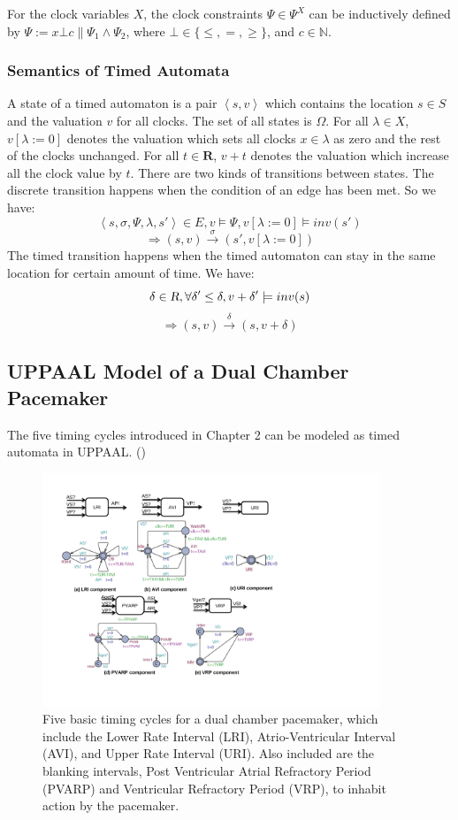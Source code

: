 For the clock variables $X$, the clock constraints $\Psi\in\Psi^X$ can be inductively defined by $\Psi:=x\bot c\|\Psi_1\wedge\Psi_2$, where $\bot\in\{\leq,=,\geq\}$, and $c\in\mathbb{N}$.
\subsubsection{Semantics of Timed Automata}
A state of a timed automaton is a pair $\left\langle s,v\right\rangle$ which contains the location $s\in S$ and the valuation $v$ for all clocks. The set of all states is $\Omega$. For all $\lambda\in X$, $v[\lambda :=0]$ denotes the valuation which sets all clocks $x\in\lambda$ as zero and the rest of the clocks unchanged. For all $t\in \textbf{R}$, $v+t$ denotes the valuation which increase all the clock value by $t$. There are two kinds of transitions between states. The \textsf{discrete transition} happens when the condition of an edge has been met. So we have:
$$\left\langle s,\sigma,\Psi,\lambda,s'\right\rangle\in E,v\models \Psi,v[\lambda :=0]\models inv(s')$$
$$\Rightarrow (s,v)\xrightarrow{\sigma}(s',v[\lambda :=0])$$
The \textsf{timed transition} happens when the timed automaton can stay in the same location for certain amount of time. We have:
$$\delta\in \textsl{R},\forall \delta'\leq\delta, v+\delta'\models inv(s)$$
$$\Rightarrow (s,v)\xrightarrow{\delta}(s,v+\delta)$$


\subsection{UPPAAL Model of a Dual Chamber Pacemaker}
The five timing cycles introduced in Chapter 2 can be modeled as timed automata in UPPAAL. ()

\begin{figure}[!t]
\center
\includegraphics[width=0.9\textwidth]{figs/pacemaker.pdf}
\caption{Five basic timing cycles for a dual chamber pacemaker, which include the Lower Rate Interval (LRI), Atrio-Ventricular Interval (AVI), and Upper Rate Interval (URI). Also included are the blanking intervals, Post Ventricular Atrial Refractory Period (PVARP) and Ventricular Refractory Period (VRP), to inhabit action by the pacemaker.}
\label{fig:PMdesign}
\end{figure} 

